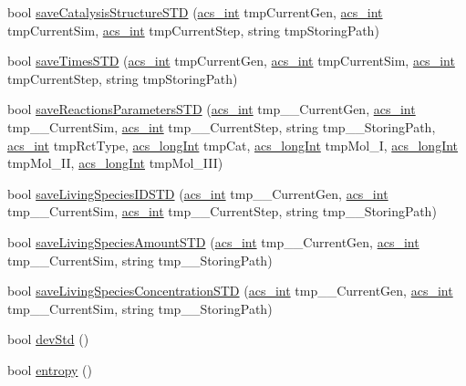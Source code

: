 \begin{DoxyCompactItemize}
\item 
bool \hyperlink{a00014_a0a799b3a42bd90845a915298e184708c}{save\-Catalysis\-Structure\-S\-T\-D} (\hyperlink{a00050_a8d277355641a098190360234e2ebde35}{acs\-\_\-int} tmp\-Current\-Gen, \hyperlink{a00050_a8d277355641a098190360234e2ebde35}{acs\-\_\-int} tmp\-Current\-Sim, \hyperlink{a00050_a8d277355641a098190360234e2ebde35}{acs\-\_\-int} tmp\-Current\-Step, string tmp\-Storing\-Path)
\item 
bool \hyperlink{a00014_a73e83c4fcfe612514714a6692270351e}{save\-Times\-S\-T\-D} (\hyperlink{a00050_a8d277355641a098190360234e2ebde35}{acs\-\_\-int} tmp\-Current\-Gen, \hyperlink{a00050_a8d277355641a098190360234e2ebde35}{acs\-\_\-int} tmp\-Current\-Sim, \hyperlink{a00050_a8d277355641a098190360234e2ebde35}{acs\-\_\-int} tmp\-Current\-Step, string tmp\-Storing\-Path)
\item 
bool \hyperlink{a00014_ad78fcf39a80e447a9aa2f84ab74335e5}{save\-Reactions\-Parameters\-S\-T\-D} (\hyperlink{a00050_a8d277355641a098190360234e2ebde35}{acs\-\_\-int} tmp\-\_\-\-\_\-\-Current\-Gen, \hyperlink{a00050_a8d277355641a098190360234e2ebde35}{acs\-\_\-int} tmp\-\_\-\-\_\-\-Current\-Sim, \hyperlink{a00050_a8d277355641a098190360234e2ebde35}{acs\-\_\-int} tmp\-\_\-\-\_\-\-Current\-Step, string tmp\-\_\-\-\_\-\-Storing\-Path, \hyperlink{a00050_a8d277355641a098190360234e2ebde35}{acs\-\_\-int} tmp\-Rct\-Type, \hyperlink{a00050_a19319d75f02db4308bc5c0026d98cd85}{acs\-\_\-long\-Int} tmp\-Cat, \hyperlink{a00050_a19319d75f02db4308bc5c0026d98cd85}{acs\-\_\-long\-Int} tmp\-Mol\-\_\-\-I, \hyperlink{a00050_a19319d75f02db4308bc5c0026d98cd85}{acs\-\_\-long\-Int} tmp\-Mol\-\_\-\-I\-I, \hyperlink{a00050_a19319d75f02db4308bc5c0026d98cd85}{acs\-\_\-long\-Int} tmp\-Mol\-\_\-\-I\-I\-I)
\item 
bool \hyperlink{a00014_a623c3cda23a18cb7b039c5a666408d72}{save\-Living\-Species\-I\-D\-S\-T\-D} (\hyperlink{a00050_a8d277355641a098190360234e2ebde35}{acs\-\_\-int} tmp\-\_\-\-\_\-\-Current\-Gen, \hyperlink{a00050_a8d277355641a098190360234e2ebde35}{acs\-\_\-int} tmp\-\_\-\-\_\-\-Current\-Sim, \hyperlink{a00050_a8d277355641a098190360234e2ebde35}{acs\-\_\-int} tmp\-\_\-\-\_\-\-Current\-Step, string tmp\-\_\-\-\_\-\-Storing\-Path)
\item 
bool \hyperlink{a00014_a26c70b0a84c37c87952628d4a328c238}{save\-Living\-Species\-Amount\-S\-T\-D} (\hyperlink{a00050_a8d277355641a098190360234e2ebde35}{acs\-\_\-int} tmp\-\_\-\-\_\-\-Current\-Gen, \hyperlink{a00050_a8d277355641a098190360234e2ebde35}{acs\-\_\-int} tmp\-\_\-\-\_\-\-Current\-Sim, string tmp\-\_\-\-\_\-\-Storing\-Path)
\item 
bool \hyperlink{a00014_aedf8d90e1fe734948bf2213489840582}{save\-Living\-Species\-Concentration\-S\-T\-D} (\hyperlink{a00050_a8d277355641a098190360234e2ebde35}{acs\-\_\-int} tmp\-\_\-\-\_\-\-Current\-Gen, \hyperlink{a00050_a8d277355641a098190360234e2ebde35}{acs\-\_\-int} tmp\-\_\-\-\_\-\-Current\-Sim, string tmp\-\_\-\-\_\-\-Storing\-Path)
\item 
bool \hyperlink{a00014_ae7fd21d14f81c4854b3a6163b0278857}{dev\-Std} ()
\item 
bool \hyperlink{a00014_a4e9b60ec8b05e888cf0e55def03ee906}{entropy} ()
\end{DoxyCompactItemize}


